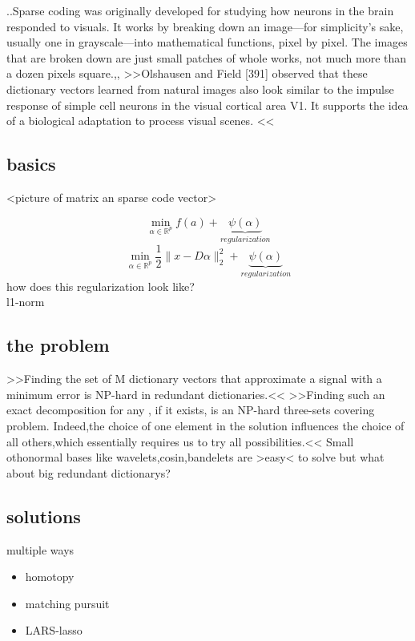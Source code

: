 \begin{frame}
..Sparse coding was originally developed for studying how neurons in the brain responded to visuals. It works by breaking down an image—for simplicity's sake, usually one in grayscale—into mathematical functions, pixel by pixel. The images that are broken down are just small patches of whole works, not much more than a dozen pixels square.,,
>>Olshausen and Field [391] observed that these
dictionary vectors learned from natural images also look similar to the impulse
response of simple cell neurons in the visual cortical area V1. It supports the idea
of a biological adaptation to process visual scenes. <<
\end{frame}

\subsection{basics}
\begin{frame}
<picture of matrix an sparse code vector>
\end{frame}

\begin{frame}
\[ 
\min_{\alpha\in\mathbb{R}^{p}} f(a) + \underbrace{\psi(\alpha)}_{regularization} 
\]
\[
\min_{\alpha\in\mathbb{R}^{p}} \frac{1}{2} \lVert x - D\alpha \rVert^{2}_{2} + \underbrace{\psi(\alpha)}_{regularization}
\] 
how does this regularization look like? \\
l1-norm

\end{frame}

\subsection{the problem}
\begin{frame}
>>Finding the set of M dictionary vectors that approximate a signal with a minimum
error is NP-hard in redundant dictionaries.<<
>>Finding such an exact decomposition for any , if it exists, is an NP-hard three-sets
covering problem. Indeed,the choice of one element in the solution influences the
choice of all others,which essentially requires us to try all possibilities.<<
Small othonormal bases like wavelets,cosin,bandelets are >easy< to solve but what about big redundant dictionarys?
\end{frame}

\subsection{solutions}
\begin{frame}
multiple ways
\begin{itemize}
\item homotopy
\item matching pursuit
\item LARS-lasso
\end{itemize}
\end{frame}

